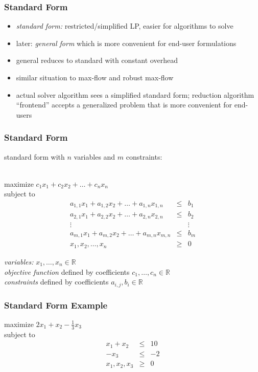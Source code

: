 \documentclass{beamer}
\newcommand{\stanza}{ \\~\ }
\begin{document}
\begin{frame} \frametitle{Standard Form}
\begin{itemize}
  \item \emph{standard form:} restricted/simplified LP, easier for algorithms to solve
  \item later: \emph{general form} which is more convenient for end-user
    formulations
  \item general reduces to standard with constant overhead
  \item similar situation to max-flow and robust max-flow
  \item actual solver algorithm sees a simplified standard form; reduction
    algorithm ``frontend'' accepts a generalized problem that is more convenient
    for end-users
\end{itemize}
\end{frame}

\begin{frame} \frametitle{Standard Form}
standard form with $n$ variables and $m$ constraints:\stanza

maximize $c_1 x_1 + c_2 x_2 + \ldots + c_n x_n$ \\
subject to
\begin{eqnarray*}
a_{1,1} x_1 + a_{1,2} x_2 + \ldots + a_{1, n} x_{1, n} &\leq& b_1 \\
a_{2,1} x_1 + a_{2,2} x_2 + \ldots + a_{2, n} x_{2, n} &\leq& b_2 \\
\vdots & & \vdots \\
a_{m,1} x_1 + a_{m,2} x_2 + \ldots + a_{m, n} x_{m, n} &\leq& b_m \\
x_1, x_2, \ldots, x_n &\geq& 0
\end{eqnarray*}

\emph{variables:} $x_1, \ldots, x_n \in \mathbb{R}$ \\
\emph{objective function} defined by coefficients $c_1, \ldots, c_n \in \mathbb{R}$ \\
\emph{constraints} defined by coefficients $a_{i,j}, b_i \in \mathbb{R}$
\end{frame}

\begin{frame} \frametitle{Standard Form Example}
maximize $2 x_1 + x_2 - \frac{1}{3} x_3$ \\
subject to
\begin{eqnarray*}
x_1 + x_2 &\leq& 10 \\
-x_3 &\leq& -2 \\
x_1, x_2, x_3 &\geq& 0
\end{eqnarray*}
\end{frame}
\end{document}
